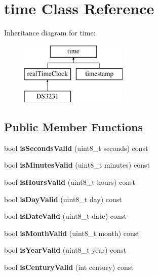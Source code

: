 \hypertarget{classtime}{}\section{time Class Reference}
\label{classtime}
Inheritance diagram for time\+:\begin{figure}[H]
\begin{center}
\leavevmode
\includegraphics[height=3.000000cm]{classtime}
\end{center}
\end{figure}
\subsection*{Public Member Functions}
\begin{DoxyCompactItemize}
\item 
\mbox{\label{classtime_aeba296b9c9c6ec09250f98a20062a500}} 
bool {\bfseries is\+Seconds\+Valid} (uint8\+\_\+t seconds) const
\item 
\mbox{\label{classtime_adafa6fb7a20aee5e865a51576ab9340b}} 
bool {\bfseries is\+Minutes\+Valid} (uint8\+\_\+t minutes) const
\item 
\mbox{\label{classtime_afe3fbaa007cbc8072b36c8bd2a556365}} 
bool {\bfseries is\+Hours\+Valid} (uint8\+\_\+t hours) const
\item 
\mbox{\label{classtime_a126cf22d6b3a7a36603e2cb390082d2f}} 
bool {\bfseries is\+Day\+Valid} (uint8\+\_\+t day) const
\item 
\mbox{\label{classtime_aa678e8f53a12adda2f807e6a44ebc46d}} 
bool {\bfseries is\+Date\+Valid} (uint8\+\_\+t date) const
\item 
\mbox{\label{classtime_a92c265ce96b24f9bdfa960144a0bce11}} 
bool {\bfseries is\+Month\+Valid} (uint8\+\_\+t month) const
\item 
\mbox{\label{classtime_ad6269d0f650cfc32e0ac83b09816abad}} 
bool {\bfseries is\+Year\+Valid} (uint8\+\_\+t year) const
\item 
\mbox{\label{classtime_a01413b7e5754345cf032cc7afa13efb0}} 
bool {\bfseries is\+Century\+Valid} (int century) const
\end{DoxyCompactItemize}
